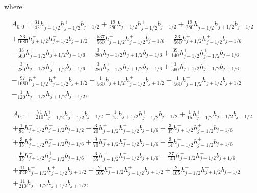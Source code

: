 \documentclass[12pt]{article}
\begin{document}
where

\begin{multline*} A_{0,0} = \frac{31}{42} h_{j-1/2}^+ h_{j-1/2}^+ b_{j-1/2}+\frac{19}{280} h_{j+1/2}^- h_{j-1/2}^+ b_{j-1/2}+\frac{19}{280} h_{j-1/2}^+ h_{j+1/2}^- b_{j-1/2}\\+\frac{23}{1680} h_{j+1/2}^- h_{j+1/2}^- b_{j-1/2}-\frac{537}{560} h_{j-1/2}^+ h_{j-1/2}^+ b_{j-1/6}-\frac{33}{560} h_{j+1/2}^- h_{j-1/2}^+ b_{j-1/6}\\-\frac{33}{560} h_{j-1/2}^+ h_{j+1/2}^- b_{j-1/6}-\frac{3}{280} h_{j+1/2}^- h_{j+1/2}^- b_{j-1/6}+\frac{39}{140} h_{j-1/2}^+ h_{j-1/2}^+ b_{j+1/6}\\-\frac{3}{280} h_{j+1/2}^- h_{j-1/2}^+ b_{j+1/6}-\frac{3}{280} h_{j-1/2}^+ h_{j+1/2}^- b_{j+1/6}+\frac{3}{560} h_{j+1/2}^- h_{j+1/2}^- b_{j+1/6}\\-\frac{97}{1680} h_{j-1/2}^+ h_{j-1/2}^+ b_{j+1/2}+\frac{1}{560} h_{j+1/2}^- h_{j-1/2}^+ b_{j+1/2}+\frac{1}{560} h_{j-1/2}^+ h_{j+1/2}^- b_{j+1/2}\\-\frac{1}{120} h_{j+1/2}^- h_{j+1/2}^- b_{j+1/2}, \end{multline*}

\begin{multline*} A_{0,1} = \frac{71}{210} h_{j-1/2}^+ h_{j-1/2}^+ b_{j-1/2}+\frac{1}{15} h_{j+1/2}^- h_{j-1/2}^+ b_{j-1/2}+\frac{1}{15} h_{j-1/2}^+ h_{j+1/2}^- b_{j-1/2}\\+\frac{1}{84} h_{j+1/2}^- h_{j+1/2}^- b_{j-1/2}-\frac{3}{20} h_{j-1/2}^+ h_{j-1/2}^+ b_{j-1/6}+\frac{3}{35} h_{j+1/2}^- h_{j-1/2}^+ b_{j-1/6}\\+\frac{3}{35} h_{j-1/2}^+ h_{j+1/2}^- b_{j-1/6}+\frac{9}{70} h_{j+1/2}^- h_{j+1/2}^- b_{j-1/6}-\frac{3}{14} h_{j-1/2}^+ h_{j-1/2}^+ b_{j+1/6}\\-\frac{6}{35} h_{j+1/2}^- h_{j-1/2}^+ b_{j+1/6}-\frac{6}{35} h_{j-1/2}^+ h_{j+1/2}^- b_{j+1/6}-\frac{27}{140} h_{j+1/2}^- h_{j+1/2}^- b_{j+1/6}\\+\frac{11}{420} h_{j-1/2}^+ h_{j-1/2}^+ b_{j+1/2}+\frac{2}{105} h_{j+1/2}^- h_{j-1/2}^+ b_{j+1/2}+\frac{2}{105} h_{j-1/2}^+ h_{j+1/2}^- b_{j+1/2}\\+\frac{11}{210} h_{j+1/2}^- h_{j+1/2}^- b_{j+1/2}, \end{multline*}
\end{document}
